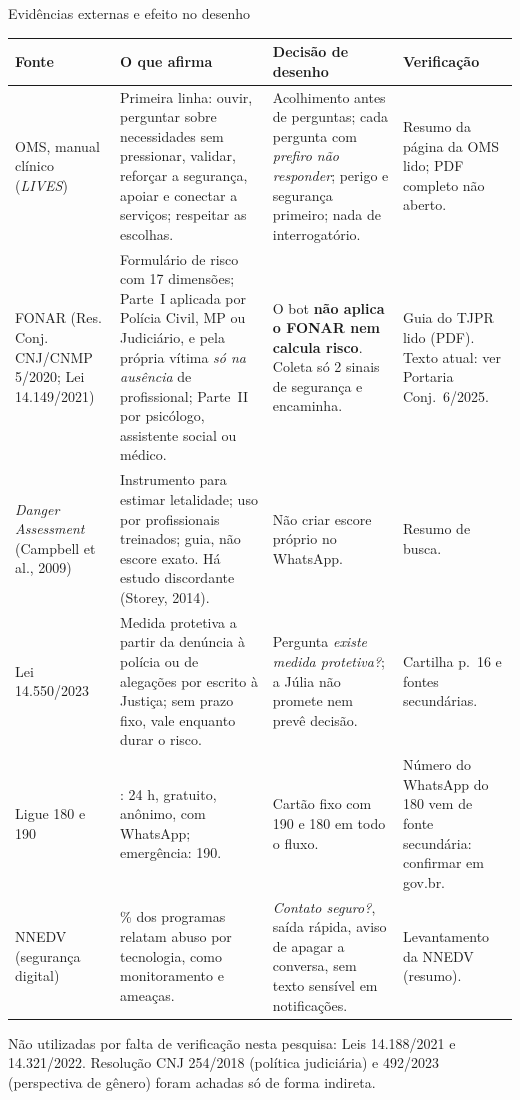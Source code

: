 \documentclass[aspectratio=169,10pt]{beamer}
\begin{document}
\begin{frame}{Evidências externas e efeito no desenho}
\fontsize{6.2}{7.4}\selectfont
\begin{tabularx}{\linewidth}{@{}>{\raggedright\arraybackslash}p{2.6cm}>{\raggedright\arraybackslash}X>{\raggedright\arraybackslash}X>{\raggedright\arraybackslash}p{2.0cm}@{}}
\toprule
Fonte & O que afirma & Decisão de desenho & Verificação \\
\midrule
OMS, manual clínico (\emph{LIVES}) & Primeira linha: ouvir, perguntar sobre necessidades sem pressionar, validar, reforçar a segurança, apoiar e conectar a serviços; respeitar as escolhas. & Acolhimento antes de perguntas; cada pergunta com \emph{prefiro não responder}; perigo e segurança primeiro; nada de interrogatório. & Resumo da página da OMS lido; PDF completo não aberto. \\
FONAR (Res. Conj. CNJ/CNMP 5/2020; Lei 14.149/2021) & Formulário de risco com 17 dimensões; Parte~I aplicada por Polícia Civil, MP ou Judiciário, e pela própria vítima \emph{só na ausência} de profissional; Parte~II por psicólogo, assistente social ou médico. & O bot \textbf{não aplica o FONAR nem calcula risco}. Coleta só 2 sinais de segurança e encaminha. & Guia do TJPR lido (PDF). Texto atual: ver Portaria Conj.~6/2025. \\
\emph{Danger Assessment} (Campbell et al., 2009) & Instrumento para estimar letalidade; uso por profissionais treinados; guia, não escore exato. Há estudo discordante (Storey, 2014). & Não criar escore próprio no WhatsApp. & Resumo de busca. \\
Lei 14.550/2023 & Medida protetiva a partir da denúncia à polícia ou de alegações por escrito à Justiça; sem prazo fixo, vale enquanto durar o risco. & Pergunta \emph{existe medida protetiva?}; a Júlia não promete nem prevê decisão. & Cartilha p.~16 e fontes secundárias. \\
Ligue 180 e 190 & 180: 24 h, gratuito, anônimo, com WhatsApp; emergência: 190. & Cartão fixo com 190 e 180 em todo o fluxo. & \alert{Número do WhatsApp do 180 vem de fonte secundária: confirmar em gov.br.} \\
NNEDV (segurança digital) & 97\% dos programas relatam abuso por tecnologia, como monitoramento e ameaças. & \emph{Contato seguro?}, saída rápida, aviso de apagar a conversa, sem texto sensível em notificações. & Levantamento da NNEDV (resumo). \\
\bottomrule
\end{tabularx}
\vskip3pt
{\tiny\textcolor{cinza}{Não utilizadas por falta de verificação nesta pesquisa: Leis 14.188/2021 e 14.321/2022. Resolução CNJ 254/2018 (política judiciária) e 492/2023 (perspectiva de gênero) foram achadas só de forma indireta.}}
\end{frame}
\end{document}

